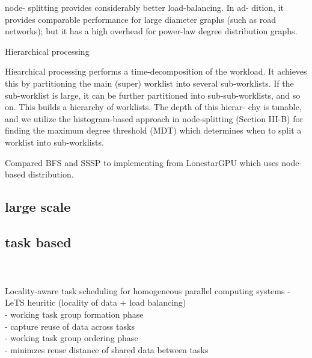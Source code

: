 \documentclass{article}
\begin{document}
node- splitting provides considerably better load-balancing. In ad- dition, it provides comparable performance for large diameter graphs (such as road networks); but it has a high overhead for power-law degree distribution graphs. 

Hierarchical processing

Hiearchical processing performs a time-decomposition of the workload. It achieves this by partitioning the main (super) worklist into several sub-worklists. If the sub-worklist is large, it can be further partitioned into sub-sub-worklists, and so on. This builds a hierarchy of worklists. The depth of this hierar- chy is tunable, and we utilize the histogram-based approach in node-splitting (Section III-B) for finding the maximum degree threshold (MDT) which determines when to split a worklist into sub-worklists. 

Compared BFS and SSSP to implementing from LonestarGPU which uses node-based distribution.


\subsection{large scale}

\cite{PEARCE2017}
\cite{BERLINSKA201814}
\cite{8017633}
\cite{DEVINE2005133}
\cite{javataskpool}
\cite{barat:tel-01672546}



\subsection{task based}

\cite{CPE:CPE1631}\\
\cite{Bhatti2017}\\
Locality-aware task scheduling for homogeneous parallel computing systems
- LeTS heuritic (locality of data + load balancing)\\ 
- working task group formation phase\\
	- capture reuse of data across tasks\\
- working task group ordering phase\\
	- minimzes reuse distance of shared data between tasks\\
\end{document}
